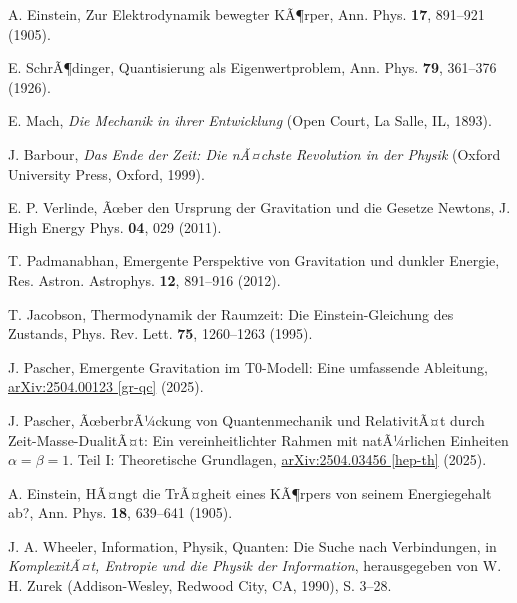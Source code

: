 ﻿\documentclass[twocolumn,aps,prl]{revtex4-2}
\begin{document}
{{{{{{{{{{{{{{{{\begin{thebibliography}{99}
																				 A. Einstein, Zur Elektrodynamik bewegter KÃ¶rper, Ann. Phys. \textbf{17}, 891--921 (1905).
																				
																				 E. SchrÃ¶dinger, Quantisierung als Eigenwertproblem, Ann. Phys. \textbf{79}, 361--376 (1926).
																				
																				 E. Mach, \textit{Die Mechanik in ihrer Entwicklung} (Open Court, La Salle, IL, 1893).
																				
																				 J. Barbour, \textit{Das Ende der Zeit: Die nÃ¤chste Revolution in der Physik} (Oxford University Press, Oxford, 1999).
																				
																				 E. P. Verlinde, Ãœber den Ursprung der Gravitation und die Gesetze Newtons, J. High Energy Phys. \textbf{04}, 029 (2011).
																				
																				 T. Padmanabhan, Emergente Perspektive von Gravitation und dunkler Energie, Res. Astron. Astrophys. \textbf{12}, 891--916 (2012).
																				
																				 T. Jacobson, Thermodynamik der Raumzeit: Die Einstein-Gleichung des Zustands, Phys. Rev. Lett. \textbf{75}, 1260--1263 (1995).
																				
																				 J. Pascher, Emergente Gravitation im T0-Modell: Eine umfassende Ableitung, \href{https://github.com/jpascher/T0-Time-Mass-Duality/tree/main/2/pdf/Deutsch/EmergentGravT0.pdf}{arXiv:2504.00123 [gr-qc]} (2025).
																				
																				 J. Pascher, ÃœberbrÃ¼ckung von Quantenmechanik und RelativitÃ¤t durch Zeit-Masse-DualitÃ¤t: Ein vereinheitlichter Rahmen mit natÃ¼rlichen Einheiten \(\alpha = \beta = 1\). Teil I: Theoretische Grundlagen, \href{https://github.com/jpascher/T0-Time-Mass-Duality/tree/main/2/pdf/Deutsch/Teil1Theorie.pdf}{arXiv:2504.03456 [hep-th]} (2025).
																				
																				 A. Einstein, HÃ¤ngt die TrÃ¤gheit eines KÃ¶rpers von seinem Energiegehalt ab?, Ann. Phys. \textbf{18}, 639--641 (1905).
																				
																				 J. A. Wheeler, Information, Physik, Quanten: Die Suche nach Verbindungen, in \textit{KomplexitÃ¤t, Entropie und die Physik der Information}, herausgegeben von W. H. Zurek (Addison-Wesley, Redwood City, CA, 1990), S. 3--28.
																				

\end{thebibliography}}}}}}}}}}}}}}}}}
\end{document}
